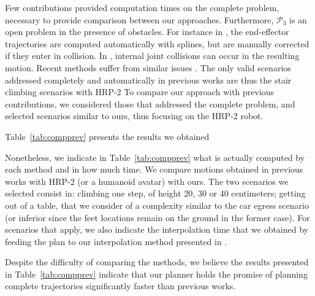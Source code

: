 Few contributions provided computation times on the complete problem, necessary to provide comparison between our approaches. 
Furthermore, $\mathcal{P}_3$ is an open problem in the presence of obstacles. For instance in \cite{DBLP:conf/iser/EscandeKMG08}, the end-effector trajectories are computed automatically with splines, but are manually corrected if they enter in collision. In \citep{Mordatch:2012:DCB:2185520.2185539}, internal joint collisions can occur in the resulting motion.
Recent methods suffer from similar issues \citep{Carpentier2016}.
The only valid scenarios addressed completely and automatically in previous works are thus the stair climbing scenarios with HRP-2 
To compare our approach with previous contributions, we considered those that addressed the complete problem, and selected scenarios similar to ours, thus focusing on the HRP-2 robot.

Table~\ref{tab:compprev} presents the results we obtained 

Nonetheless, we indicate in Table~\ref{tab:compprev} what is actually computed by each method and in how much time.
We compare motions obtained in previous works with HRP-2 (or a humanoid avatar) with ours.
The two scenarios we selected consist in:  climbing one step, of height 20, 30 or 40 centimeters; 
getting out of a table, that we consider of a complexity similar to the car egress scenario (or inferior since the feet locations remain on the ground in the former case).
For scenarios that apply, we also indicate the interpolation time that we obtained by feeding the plan to our interpolation method presented in \cite{Carpentier2016}.

Despite the difficulty of comparing the methods, we believe the results presented in Table~\ref{tab:compprev} indicate that our planner holds the promise of planning complete trajectories significantly faster than previous works.



